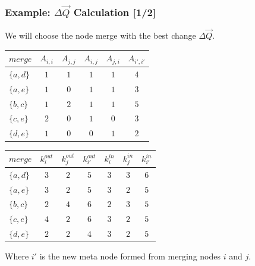 \documentclass{beamer}
\begin{document}
\begin{frame}

    \frametitle{Example: $ \Delta \vec{Q} $ Calculation [1/2]}

    We will choose the node merge with the best change $ \Delta \vec{Q} $.\pause

    \vspace{2.5mm}
    \begin{center}
        \begin{tabular}{l | c c c c c}
            $ merge    $ & $ A_{i,i} $ & $ A_{j,j} $ & $ A_{i,j} $ & $ A_{j,i} $ & $ A_{i',i'} $  \\
            \hline
            $ \{a, d\} $ & $ 1 $ & $ 1 $ & $ 1 $ & $ 1 $ & $ 4 $ \\
            $ \{a, e\} $ & $ 1 $ & $ 0 $ & $ 1 $ & $ 1 $ & $ 3 $ \\
            $ \{b, c\} $ & $ 1 $ & $ 2 $ & $ 1 $ & $ 1 $ & $ 5 $ \\
            $ \{c, e\} $ & $ 2 $ & $ 0 $ & $ 1 $ & $ 0 $ & $ 3 $ \\
            $ \{d, e\} $ & $ 1 $ & $ 0 $ & $ 0 $ & $ 1 $ & $ 2 $ \\
        \end{tabular}
    \end{center}\pause

    \begin{center}
        \begin{tabular}{l | c c c c c c}
            $ merge    $ & $ k_{i}^{out} $ & $ k_{j}^{out} $ & $ k_{i'}^{out} $ & $ k_{i}^{in} $ & $ k_{j}^{in} $ & $ k_{i'}^{in} $ \\
            \hline
            $ \{a, d\} $ & $ 3 $ & $ 2 $ & $ 5 $ & $ 3 $ & $ 3 $ & $ 6 $ \\
            $ \{a, e\} $ & $ 3 $ & $ 2 $ & $ 5 $ & $ 3 $ & $ 2 $ & $ 5 $ \\
            $ \{b, c\} $ & $ 2 $ & $ 4 $ & $ 6 $ & $ 2 $ & $ 3 $ & $ 5 $ \\
            $ \{c, e\} $ & $ 4 $ & $ 2 $ & $ 6 $ & $ 3 $ & $ 2 $ & $ 5 $ \\
            $ \{d, e\} $ & $ 2 $ & $ 2 $ & $ 4 $ & $ 3 $ & $ 2 $ & $ 5 $ \\
        \end{tabular}
    \end{center}\pause

    \vspace{2.5mm}
    Where $ i' $ is the new meta node formed from merging nodes $ i $ and $ j $.

\end{frame}
\end{document}
